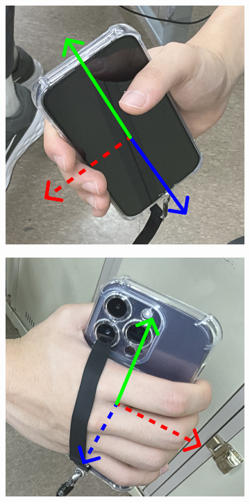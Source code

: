 \documentclass{article}
\begin{document}
    \FloatBarrier
    \begin{figure}[ht]
        \centering
        \begin{subfigure}
            {0.33\textwidth}
            \centering
            \includegraphics[width=\textwidth]{2_3_3_1.png}
            \label{fig:grip_1}
        \end{subfigure}%
        \begin{subfigure}
            {0.33\textwidth}
            \centering
            \includegraphics[width=\textwidth]{2_3_3_2.png}

\end{subfigure}
\end{figure}
\end{document}
